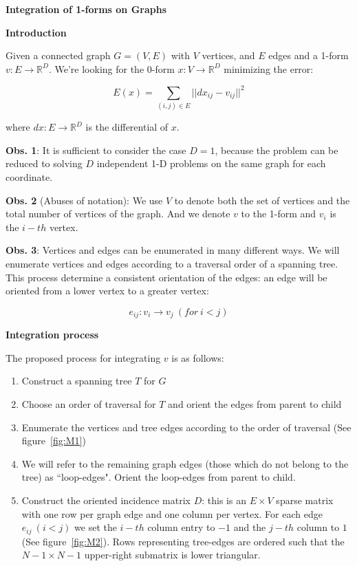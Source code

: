 \documentclass[a4paper,11pt]{article}
\begin{document}
\textbf{Integration of 1-forms on Graphs}

\bigskip

\textbf{Introduction}

\bigskip

Given a connected graph $G=(V,E)$ with $V$ vertices, and $E$ edges and a 
1-form $v: E \rightarrow \mathbb{R}^D$. We're looking for the 0-form 
$x: V \rightarrow \mathbb{R}^D$ minimizing the error:

$$E(x) = \sum_{(i,j) \in E} ||dx_{ij} - v_{ij}||^2$$

where $dx: E \rightarrow \mathbb{R}^D$ is the differential of $x$.

\bigskip

\textbf{Obs. 1}: It is sufficient to consider the case $D=1$, because 
the problem can be reduced to solving $D$ independent 1-D problems on 
the same graph for each coordinate.

\bigskip

\textbf{Obs. 2} (Abuses of notation): We use $V$ to denote both the set 
of vertices and the total number of vertices of the graph. And we denote 
$v$ to the 1-form and $v_i$ is the $i-th$ vertex.

\bigskip

\textbf{Obs. 3}: Vertices and edges can be enumerated in many different 
ways. We will enumerate vertices and edges according to a traversal 
order of a spanning tree. This process determine a consistent 
orientation of the edges: an edge will be oriented from a lower vertex 
to a greater vertex:

$$e_{ij}: v_i \rightarrow v_j \ (for \ i < j)$$

\bigskip

\textbf{Integration process}

\bigskip

The proposed process for integrating $v$ is as follows:

\begin{enumerate}
	\item Construct a spanning tree $T$ for $G$
	\item Choose an order of traversal for $T$ and orient the edges 
	from parent to child
	\item Enumerate the vertices and tree edges according to the order 
	of traversal (See figure~\ref{fig:M1})
	\item We will refer to the remaining graph edges (those which do not 
	belong to the tree) as ``loop-edges". Orient the loop-edges from 
	parent to child.
	\item Construct the oriented incidence matrix $D$: this is an $E \times V$ 
	sparse matrix with one row per graph edge and one column per vertex. 
	For each edge $e_{ij} \ (i < j)$ we set the $i-th$ column entry to $-1$ 
	and the $j-th$ column to $1$ (See figure~\ref{fig:M2}). Rows 
	representing tree-edges are ordered such that the $N-1 \times 
	N-1$ upper-right submatrix is lower triangular.
\end{enumerate}
\end{document}

